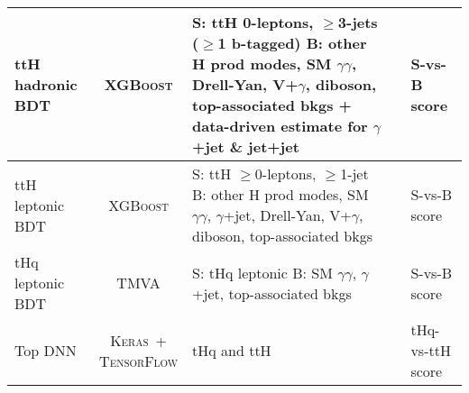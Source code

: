 \begin{tabular}{l|c|m{6cm}<{\centering}|m{12cm}<{\centering}|m{4.5cm}<{\centering}}
    ttH hadronic BDT &  \textsc{XGBoost} & \makecell*[{{m{6cm}}}]{\centering S: ttH 0-leptons, $\geq$3-jets ($\geq$1 b-tagged) \\ B: other H prod modes, SM $\gamma\gamma$, Drell-Yan, V+$\gamma$, diboson, top-associated bkgs + data-driven estimate for $\gamma$+jet \& jet+jet} &  & S-vs-B score \\ \hline
    
    ttH leptonic BDT &  \textsc{XGBoost} & \makecell*[{{m{6cm}}}]{\centering S: ttH $\geq$0-leptons, $\geq$1-jet \\ B: other H prod modes, SM $\gamma\gamma$, $\gamma$+jet, Drell-Yan, V+$\gamma$, diboson, top-associated bkgs} &  & S-vs-B score \\ \hline
    
    tHq leptonic BDT &  \textsc{TMVA} & \makecell*[{{m{6cm}}}]{\centering S: tHq leptonic \\ B: SM $\gamma\gamma$, $\gamma$+jet, top-associated bkgs} &  & S-vs-B score \\ \hline
    
    Top DNN &  \makecell{\textsc{Keras}~+\\\textsc{TensorFlow}} & tHq and ttH &  & tHq-vs-ttH score \\
\end{tabular}